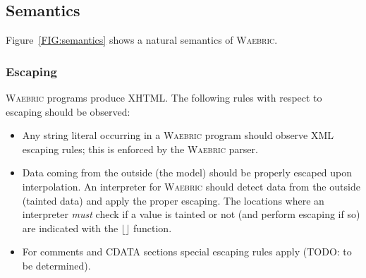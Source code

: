 \documentclass[a4paper]{article}
\def\waebric{\textsc{Waebric}\xspace}
\def\hescape#1{\ensuremath{\lfloor #1\rfloor}}
\begin{document}
\subsection{Semantics}

Figure~\ref{FIG:semantics} shows a natural semantics of \waebric.

\subsubsection{Escaping}
\waebric programs produce XHTML.  The following rules with respect to
escaping should be observed:
\begin{itemize}
\item Any string literal occurring in a \waebric program should
  observe XML escaping rules; this is enforced by the \waebric
  parser. 
\item Data coming from the outside (the model) should be properly
  escaped upon interpolation. An interpreter for \waebric should
  detect data from the outside (tainted data) and apply the proper
  escaping. The locations where an interpreter \textit{must} check if
  a value is tainted or not (and perform escaping if so) are indicated
  with the \hescape{} function.
\item For comments and CDATA sections special escaping rules apply
  (TODO: to be determined).
\end{itemize}

\begin{comment}
\[
\begin{array}{rcl}
\text{\textbf{if}} (p)\; S &\equiv& \text{\textbf{if} } (p)\; S \text{ \textbf{else} \textbf{echo} } \text{``''}\\
\end{array}
\]
\end{comment}
\end{document}
